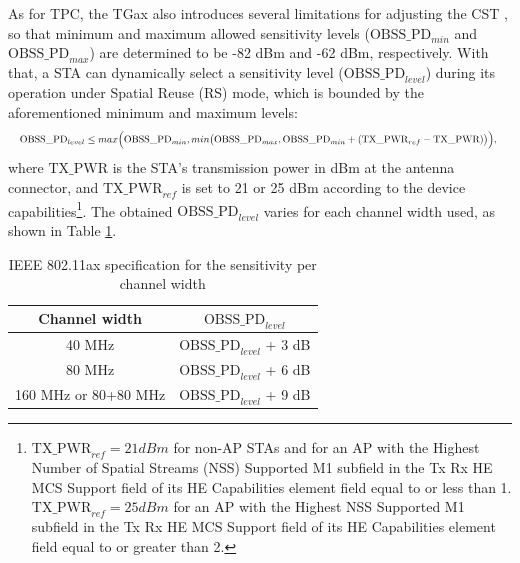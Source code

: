 \documentclass[12pt, a4paper,twoside]{tesi_upf}
\begin{document}
			As for TPC, the TGax also introduces several limitations for adjusting the CST \cite{tgax2016draft}, so that minimum and maximum allowed sensitivity levels ($\text{OBSS\_PD}_{min}$ and $\text{OBSS\_PD}_{max}$) are determined to be -82 dBm and -62 dBm, respectively. With that, a STA can dynamically select a sensitivity level ($\text{OBSS\_PD}_{level}$) during its operation under Spatial Reuse (RS) mode, which is bounded by the aforementioned minimum and maximum levels:			
			\begin{equation}
				\resizebox{1\hsize}{!}{$\text{OBSS\_PD}_{level} \leq max\Big(\text{OBSS\_PD}_{min}, min\big(\text{OBSS\_PD}_{max}, \text{OBSS\_PD}_{min} + (\text{TX\_PWR}_{ref}-\text{TX\_PWR})\big)\Big),$
				\nonumber}				
			\end{equation}
			where $\text{TX\_PWR}$ is the STA's transmission power in dBm at the antenna connector, and $\text{TX\_PWR}_{ref}$ is set to 21 or 25 dBm according to the device capabilities\footnote{$\text{TX\_PWR}_{ref} = 21 dBm$ for non-AP STAs and for an AP with the Highest Number of Spatial Streams (NSS) Supported M1 subfield in the Tx Rx HE MCS Support field of its HE Capabilities element field equal to or less than 1. $\text{TX\_PWR}_{ref} = 25 dBm$ for an AP with the Highest NSS Supported M1 subfield in the Tx Rx HE MCS Support field of its HE Capabilities element field equal to or greater than 2.}. The obtained $\text{OBSS\_PD}_{level}$ varies for each channel width used, as shown in Table \ref{tbl:sensitivity_channel_width}.
			\begin{table}[h!]
				\centering
				\begin{tabular}{|c|l|}
					\hline
					\textbf{Channel width} & \multicolumn{1}{c|}{\textbf{$\text{OBSS\_PD}_{level}$}} \\ \hline
					40 MHz                 & $\text{OBSS\_PD}_{level}$ + 3 dB                        \\ \hline
					80 MHz                 & $\text{OBSS\_PD}_{level}$ + 6 dB                        \\ \hline
					160 MHz or 80+80 MHz   & $\text{OBSS\_PD}_{level}$ + 9 dB                        \\ \hline
				\end{tabular}
				\caption{IEEE 802.11ax specification for the sensitivity per channel width}
				\label{tbl:sensitivity_channel_width}
			\end{table}			
		
\end{document}
